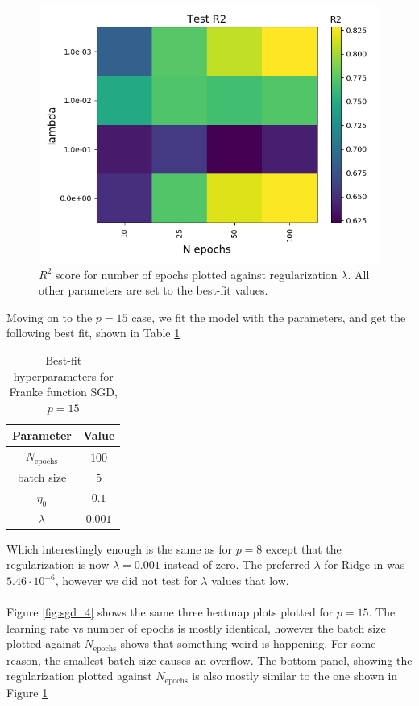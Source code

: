 \documentclass[a4paper]{article}
\newcommand{\Nepochs}{N_{\text{epochs}}}
\begin{document}
\begin{figure}[H]
	\centering
	\includegraphics[scale=0.5]{../figures/task_a/test_p8/heatmap_test_p8_lr_constant_Nhyp4434_R2_n_epochs_lambdas.png}
	\caption{$R^2$ score for number of epochs plotted against regularization $\lambda$. All other parameters are set to the best-fit values.}
	\label{fig:sgd_3}
\end{figure}
Moving on to the $p=15$ case, we fit the model with the parameters, and get the following best fit, shown in Table \ref{tab:sgd_best_fit15}
\begin{table}[H]
  \centering
  \caption{Best-fit hyperparameters for Franke function SGD, $p=15$}
  \label{tab:sgd_best_fit15}
  \begin{tabular}{c|c}
    \hline\hline
    Parameter & Value\\\hline
    $\Nepochs$ &  $100$\\
    batch size &  $5$\\
    $\eta_0$ & $0.1$ \\
    $\lambda$ & $0.001$
    \end{tabular}
\end{table}
Which interestingly enough is the same as for $p=8$ except that the regularization is now $\lambda = 0.001$ instead of zero. The preferred $\lambda$ for Ridge in \cite{Github1} was $5.46\cdot10^{-6}$, however we did not test for $\lambda$ values that low.
\\\\
Figure \ref{fig:sgd_4} shows the same three heatmap plots plotted for $p=15$. The learning rate vs number of epochs is mostly identical, however the batch size plotted against $\Nepochs$ shows that something weird is happening. For some reason, the smallest batch size causes an overflow. The bottom panel, showing the regularization plotted against $\Nepochs$ is also mostly similar to the one shown in Figure \ref{fig:sgd_3}
\end{document}

